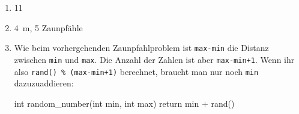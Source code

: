         \begin{enumerate}[label=\roman*)]
        \item 11
        \item \qty{4}{\meter}, 5 Zaunpfähle
        \item
            Wie beim vorhergehenden Zaunpfahlproblem ist \texttt{max-min} die Distanz zwischen \texttt{min} und \texttt{max}. Die Anzahl der Zahlen ist aber \texttt{max-min+1}. Wenn ihr also \texttt{rand() \% (max-min+1)} berechnet, braucht man nur noch \texttt{min} dazuzuaddieren:
\begin{code}[numbers=none]
int random_number(int min, int max) {
    return min + rand() %
}
\end{code}
        \end{enumerate}
